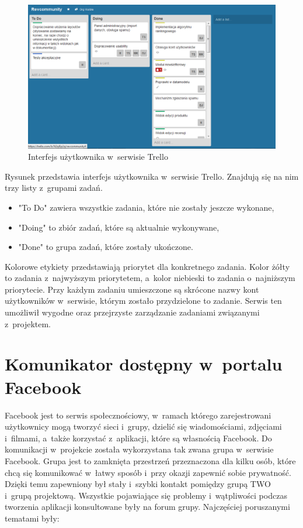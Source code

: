 \begin{figure}[h]
	\centering
	\includegraphics[width=1.00\textwidth]{images/trello.png}
	\caption{Interfejs użytkownika w~serwisie Trello}
\end{figure}


Rysunek przedstawia interfejs użytkownika w~serwisie Trello. Znajdują się na nim trzy listy z~grupami zadań.

\begin{itemize}
\item "To Do" zawiera wszystkie zadania, które nie zostały jeszcze wykonane,
\item "Doing" to zbiór zadań, które są aktualnie wykonywane,
\item "Done" to grupa zadań, które zostały ukończone.
\end{itemize}


Kolorowe etykiety przedstawiają priorytet dla konkretnego zadania. Kolor żółty to zadania z~najwyższym priorytetem, a~kolor niebieski to zadania o~najniższym priorytecie. Przy każdym zadaniu umieszczone są skrócone nazwy kont użytkowników w~serwisie, którym zostało przydzielone to zadanie. 
Serwis ten umożliwił wygodne oraz przejrzyste zarządzanie zadaniami związanymi z~projektem.

\section{Komunikator dostępny w~portalu Facebook}
Facebook jest to serwis społecznościowy, w~ramach którego zarejestrowani użytkownicy mogą tworzyć sieci i~grupy, dzielić się wiadomościami, zdjęciami i~filmami, a~także korzystać z~aplikacji, które są własnością Facebook. Do komunikacji w~projekcie została wykorzystana tak zwana grupa w~serwisie Facebook. Grupa  jest to zamknięta przestrzeń przeznaczona dla kilku osób, które chcą się komunikować w~łatwy sposób i~przy okazji zapewnić sobie prywatność. Dzięki temu zapewniony był stały i~szybki kontakt pomiędzy grupą TWO i~grupą projektową. Wszystkie pojawiające się problemy i~wątpliwości podczas tworzenia aplikacji konsultowane były na forum grupy. Najczęściej poruszanymi tematami były:

